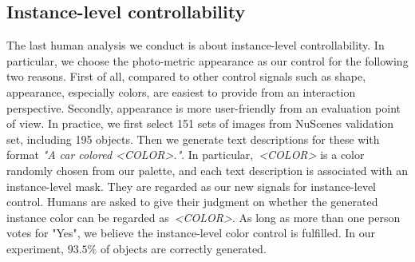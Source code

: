 \documentclass[sigconf]{acmart}
\begin{document}
\subsection{Instance-level controllability}
The last human analysis we conduct is about instance-level controllability. In particular, we choose the photo-metric appearance as our control for the following two reasons. First of all, compared to other control signals such as shape, appearance, especially colors, are easiest to provide from an interaction perspective. Secondly, appearance is more user-friendly from an evaluation point of view. In practice, we first select 151 sets of images from NuScenes validation set, including 195 objects. Then we generate text descriptions for these with format \textit{"A car colored <COLOR>."}. In particular,~\textit{<COLOR>} is a color randomly chosen from our palette, and each text description is associated with an instance-level mask. They are regarded as our new signals for instance-level control. 
Humans are asked to give their judgment on whether the generated instance color can be regarded as~\textit{<COLOR>}. 
As long as more than one person votes for "Yes", we believe the instance-level color control is fulfilled. In our experiment, $93.5\%$ of objects are correctly generated.

\end{document}
